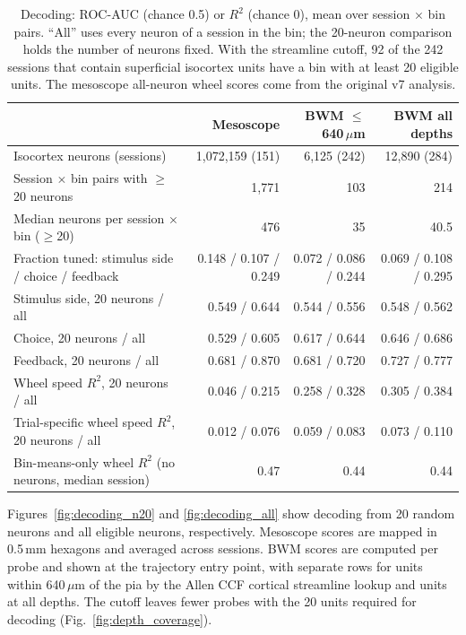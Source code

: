 \documentclass[10pt]{article}
\newcommand{\um}{\,$\mu$m}
\newcommand{\figref}[1]{Fig.~\ref{fig:#1}}
\begin{document}
\begin{table}[!htbp]
\centering\small
\begin{tabular}{lrrr}
\toprule
 & Mesoscope & BWM $\leq$640\um & BWM all depths \\
\midrule
Isocortex neurons (sessions) & 1{,}072{,}159 (151) & 6{,}125 (242) & 12{,}890 (284) \\
Session $\times$ bin pairs with $\geq$20 neurons & 1{,}771 & 103 & 214 \\
Median neurons per session $\times$ bin ($\geq$20) & 476 & 35 & 40.5 \\
Fraction tuned: stimulus side / choice / feedback & 0.148 / 0.107 / 0.249 & 0.072 / 0.086 / 0.244 & 0.069 / 0.108 / 0.295 \\
Stimulus side, 20 neurons / all & 0.549 / 0.644 & 0.544 / 0.556 & 0.548 / 0.562 \\
Choice, 20 neurons / all & 0.529 / 0.605 & 0.617 / 0.644 & 0.646 / 0.686 \\
Feedback, 20 neurons / all & 0.681 / 0.870 & 0.681 / 0.720 & 0.727 / 0.777 \\
Wheel speed $R^2$, 20 neurons / all & 0.046 / 0.215 & 0.258 / 0.328 & 0.305 / 0.384 \\
Trial-specific wheel speed $R^2$, 20 neurons / all & 0.012 / 0.076 & 0.059 / 0.083 & 0.073 / 0.110 \\
Bin-means-only wheel $R^2$ (no neurons, median session) & 0.47 & 0.44 & 0.44 \\
\bottomrule
\end{tabular}
\caption{Decoding: ROC-AUC (chance 0.5) or $R^2$ (chance 0), mean over session $\times$ bin pairs. ``All'' uses every neuron of a session in the bin; the 20-neuron comparison holds the number of neurons fixed. With the streamline cutoff, 92 of the 242 sessions that contain superficial isocortex units have a bin with at least 20 eligible units. The mesoscope all-neuron wheel scores come from the original v7 analysis.}
\label{tab:headline}
\end{table}

Figures~\ref{fig:decoding_n20} and \ref{fig:decoding_all} show decoding from 20 random neurons and all eligible neurons, respectively. Mesoscope scores are mapped in 0.5\,mm hexagons and averaged across sessions. BWM scores are computed per probe and shown at the trajectory entry point, with separate rows for units within 640\um{} of the pia by the Allen CCF cortical streamline lookup and units at all depths. The cutoff leaves fewer probes with the 20 units required for decoding (\figref{depth_coverage}).
\end{document}
